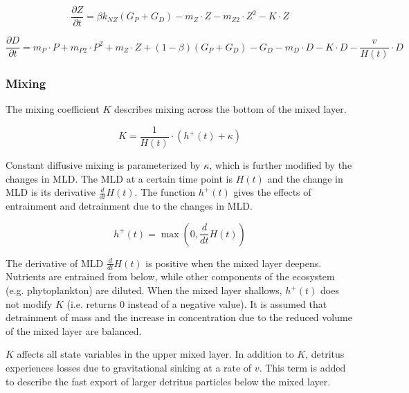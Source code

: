 \documentclass[journal abbreviation, manuscript]{copernicus}
\begin{document}
\begin{equation}
    \frac{\partial Z}{\partial t} =
    \beta k_{NZ}(G_P + G_D) %
    - m_Z \cdot Z %
    - m_{Z2} \cdot Z^2 %
    - K \cdot Z %
\end{equation}

\begin{equation}
    \frac{\partial D}{\partial t} = 
    m_P \cdot P %
    + m_{P2} \cdot P^2 %
    + m_Z \cdot Z %
    + (1 - \beta)(G_P + G_D) %
    - G_D %
    - m_D \cdot D %
    - K \cdot D %
    - \frac{v}{H(t)} \cdot D %
\end{equation}



\subsubsection{Mixing}

The mixing coefficient $K$ describes mixing across the bottom of the mixed layer.

\begin{equation}
    K = \frac{1}{H(t)} \cdot \left(h^{+}(t) + \kappa\right)
\end{equation}

Constant diffusive mixing is parameterized by $\kappa$, which is further modified by the changes in MLD. The MLD at a certain time point is $H(t)$ and the change in MLD is its derivative $\frac{d}{d t} H(t)$. The function $h^{+}(t)$ gives the effects of entrainment and detrainment due to the changes in MLD.

\begin{equation}
    h^{+}(t) = \max\left(0, \frac{d}{d t} H(t)\right)
\end{equation}

The derivative of MLD $\frac{d}{d t} H(t)$ is positive when the mixed layer deepens. Nutrients are entrained from below, while other components of the ecosystem (e.g. phytoplankton) are diluted. When the mixed layer shallows, $h^{+}(t)$ does not modify $K$ (i.e. returns 0 instead of a negative value). It is assumed that detrainment of mass and the increase in concentration due to the reduced volume of the mixed layer are balanced.

$K$ affects all state variables in the upper mixed layer. In addition to $K$, detritus experiences losses due to gravitational sinking at a rate of $v$. This term is added to describe the fast export of larger detritus particles below the mixed layer. 
\end{document}
